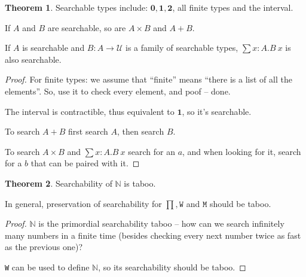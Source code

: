 \documentclass[11pt]{article}
\theoremstyle{definition}
\newtheorem{theorem}{Theorem}[section]
\newcommand{\txt}[1]{\texttt{#1}}
\renewcommand{\(}{\left(}
\renewcommand{\)}{\right)}
\newcommand{\U}{\mathcal{U}}
\newcommand{\apl}[2]{#1\ #2}
\newcommand{\Empty}{\mathbf{0}}
\newcommand{\Unit}{\mathbf{1}}
\newcommand{\Bool}{\mathbf{2}}
\newcommand{\Nat}{\mathbb{N}}
\newcommand{\dsum}[2]{\sum #1.#2}
\newcommand{\prodt}[2]{#1 \times #2}
\begin{document}
\begin{theorem}
Searchable types include: $\Empty, \Unit, \Bool$, all finite types and the interval.

If $A$ and $B$ are searchable, so are $\prodt{A}{B}$ and $A + B$.

If $A$ is searchable and $B : A \to \U$ is a family of searchable types, $\displaystyle \dsum{x : A}{\apl{B}{x}}$ is also searchable.
\end{theorem}
\begin{proof}
For finite types: we assume that ``finite'' means ``there is a list of all the elements''. So, use it to check every element, and poof -- done.

The interval is contractible, thus equivalent to $\Unit$, so it's searchable.

To search $A + B$ first search $A$, then search $B$.

To search $\prodt{A}{B}$ and $\dsum{x : A}{\apl{B}{x}}$ search for an $a$, and when looking for it, search for a $b$ that can be paired with it.
\end{proof}

\begin{theorem}
Searchability of $\Nat$ is taboo.

In general, preservation of searchability for $\prod, \txt{W}$ and $\txt{M}$ should be taboo.
\end{theorem}
\begin{proof}
$\Nat$ is the primordial searchability taboo -- how can we search infinitely many numbers in a finite time (besides checking every next number twice as fast as the previous one)?

\txt{W} can be used to define $\Nat$, so its searchability should be taboo.



\end{proof}
\end{document}
